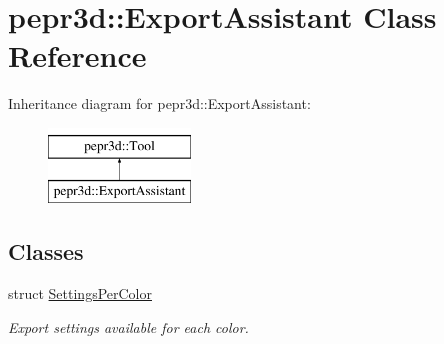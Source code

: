 \hypertarget{classpepr3d_1_1_export_assistant}{}\section{pepr3d\+::Export\+Assistant Class Reference}
\label{classpepr3d_1_1_export_assistant}
Inheritance diagram for pepr3d\+::Export\+Assistant\+:\begin{figure}[H]
\begin{center}
\leavevmode
\includegraphics[height=2.000000cm]{classpepr3d_1_1_export_assistant}
\end{center}
\end{figure}
\subsection*{Classes}
\begin{DoxyCompactItemize}
\item 
struct \mbox{\hyperlink{structpepr3d_1_1_export_assistant_1_1_settings_per_color}{Settings\+Per\+Color}}
\begin{DoxyCompactList}\small\item\em Export settings available for each color. \end{DoxyCompactList}\end{DoxyCompactItemize}
